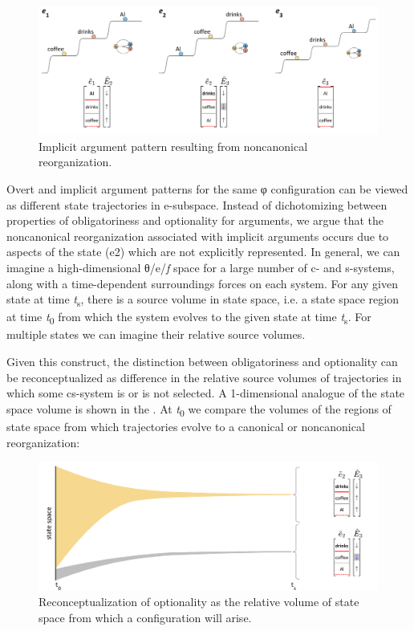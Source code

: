   
\begin{figure}
\includegraphics[width=\textwidth]{figures/Tilsen-img87.png}
\caption{Implicit argument pattern resulting from noncanonical reorganization.}
\label{fig:4:37}
\end{figure}
 

  Overt and implicit argument patterns for the same φ configuration can be viewed as different state trajectories in e-subspace. Instead of dichotomizing between properties of obligatoriness and optionality for arguments, we argue that the noncanonical reorganization associated with implicit arguments occurs due to aspects of the state (e2) which are not explicitly represented. In general, we can imagine a high-dimensional θ/e/\textit{f} space for a large number of c- and s-systems, along with a time-dependent surroundings forces on each system. For any given state at time \textit{t}\textsubscript{s}, there is a source volume in state space, i.e. a state space region at time \textit{t}\textsubscript{0} from which the system evolves to the given state at time \textit{t}\textsubscript{s}. For multiple states we can imagine their relative source volumes. 

  Given this construct, the distinction between obligatoriness and optionality can be reconceptualized as difference in the relative source volumes of trajectories in which some cs-system is or is not selected. A 1-dimensional analogue of the state space volume is shown in the {\figurebelow}. At \textit{t}\textsubscript{0} we compare the volumes of the regions of state space from which trajectories evolve to a canonical or noncanonical reorganization: 

  
\begin{figure}
\includegraphics[width=\textwidth]{figures/Tilsen-img88.png}
\caption{Reconceptualization of optionality as the relative volume of state space from which a configuration will arise.}
\label{fig:4:38}
\end{figure}
 

